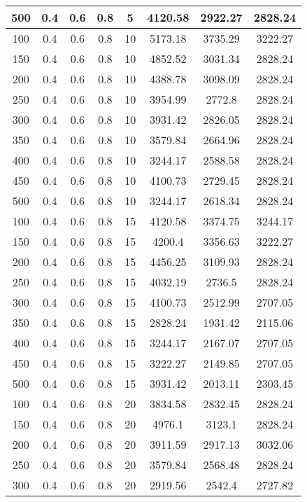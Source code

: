 \documentclass[a4paper, 12pt]{extreport}
\begin{document}
\begin{itemize}
\begin{longtable}{|c|c|c|c|c|c|c|c|}
			500 & 0.4 & 0.6 & 0.8 & 5 & 4120.58 & 2922.27 & 2828.24 \\\hline
			100 & 0.4 & 0.6 & 0.8 & 10 & 5173.18 & 3735.29 & 3222.27 \\\hline
			150 & 0.4 & 0.6 & 0.8 & 10 & 4852.52 & 3031.34 & 2828.24 \\\hline
			200 & 0.4 & 0.6 & 0.8 & 10 & 4388.78 & 3098.09 & 2828.24 \\\hline
			250 & 0.4 & 0.6 & 0.8 & 10 & 3954.99 & 2772.8 & 2828.24 \\\hline
			300 & 0.4 & 0.6 & 0.8 & 10 & 3931.42 & 2826.05 & 2828.24 \\\hline
			350 & 0.4 & 0.6 & 0.8 & 10 & 3579.84 & 2664.96 & 2828.24 \\\hline
			400 & 0.4 & 0.6 & 0.8 & 10 & 3244.17 & 2588.58 & 2828.24 \\\hline
			450 & 0.4 & 0.6 & 0.8 & 10 & 4100.73 & 2729.45 & 2828.24 \\\hline
			500 & 0.4 & 0.6 & 0.8 & 10 & 3244.17 & 2618.34 & 2828.24 \\\hline
			100 & 0.4 & 0.6 & 0.8 & 15 & 4120.58 & 3374.75 & 3244.17 \\\hline
			150 & 0.4 & 0.6 & 0.8 & 15 & 4200.4 & 3356.63 & 3222.27 \\\hline
			200 & 0.4 & 0.6 & 0.8 & 15 & 4456.25 & 3109.93 & 2828.24 \\\hline
			250 & 0.4 & 0.6 & 0.8 & 15 & 4032.19 & 2736.5 & 2828.24 \\\hline
			300 & 0.4 & 0.6 & 0.8 & 15 & 4100.73 & 2512.99 & 2707.05 \\\hline
			350 & 0.4 & 0.6 & 0.8 & 15 & 2828.24 & 1931.42 & 2115.06 \\\hline
			400 & 0.4 & 0.6 & 0.8 & 15 & 3244.17 & 2167.07 & 2707.05 \\\hline
			450 & 0.4 & 0.6 & 0.8 & 15 & 3222.27 & 2149.85 & 2707.05 \\\hline
			500 & 0.4 & 0.6 & 0.8 & 15 & 3931.42 & 2013.11 & 2303.45 \\\hline
			100 & 0.4 & 0.6 & 0.8 & 20 & 3834.58 & 2832.45 & 2828.24 \\\hline
			150 & 0.4 & 0.6 & 0.8 & 20 & 4976.1 & 3123.1 & 2828.24 \\\hline
			200 & 0.4 & 0.6 & 0.8 & 20 & 3911.59 & 2917.13 & 3032.06 \\\hline
			250 & 0.4 & 0.6 & 0.8 & 20 & 3579.84 & 2568.48 & 2828.24 \\\hline
			300 & 0.4 & 0.6 & 0.8 & 20 & 2919.56 & 2542.4 & 2727.82 \\\hline

\end{longtable}
\end{itemize}
\end{document}
